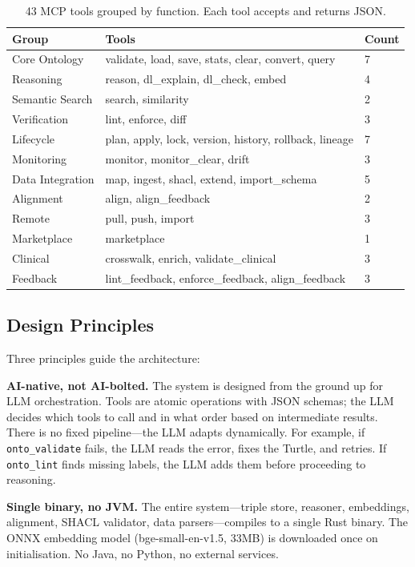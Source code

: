 \documentclass[runningheads]{llncs}
\begin{document}
\begin{table}[t]
\centering
\caption{43 MCP tools grouped by function. Each tool accepts and returns JSON.}
\label{tab:tools}
\small
\begin{tabular}{@{}lll@{}}
\toprule
\textbf{Group} & \textbf{Tools} & \textbf{Count} \\
\midrule
Core Ontology & validate, load, save, stats, clear, convert, query & 7 \\
Reasoning & reason, dl\_explain, dl\_check, embed & 4 \\
Semantic Search & search, similarity & 2 \\
Verification & lint, enforce, diff & 3 \\
Lifecycle & plan, apply, lock, version, history, rollback, lineage & 7 \\
Monitoring & monitor, monitor\_clear, drift & 3 \\
Data Integration & map, ingest, shacl, extend, import\_schema & 5 \\
Alignment & align, align\_feedback & 2 \\
Remote & pull, push, import & 3 \\
Marketplace & marketplace & 1 \\
Clinical & crosswalk, enrich, validate\_clinical & 3 \\
Feedback & lint\_feedback, enforce\_feedback, align\_feedback & 3 \\
\bottomrule
\end{tabular}
\end{table}

\subsection{Design Principles}

Three principles guide the architecture:

\textbf{AI-native, not AI-bolted.} The system is designed from the ground up for LLM orchestration. Tools are atomic operations with JSON schemas; the LLM decides which tools to call and in what order based on intermediate results. There is no fixed pipeline—the LLM adapts dynamically. For example, if \texttt{onto\_validate} fails, the LLM reads the error, fixes the Turtle, and retries. If \texttt{onto\_lint} finds missing labels, the LLM adds them before proceeding to reasoning.

\textbf{Single binary, no JVM.} The entire system—triple store, reasoner, embeddings, alignment, SHACL validator, data parsers—compiles to a single Rust binary. The ONNX embedding model (bge-small-en-v1.5, 33MB) is downloaded once on initialisation. No Java, no Python, no external services.
\end{document}
